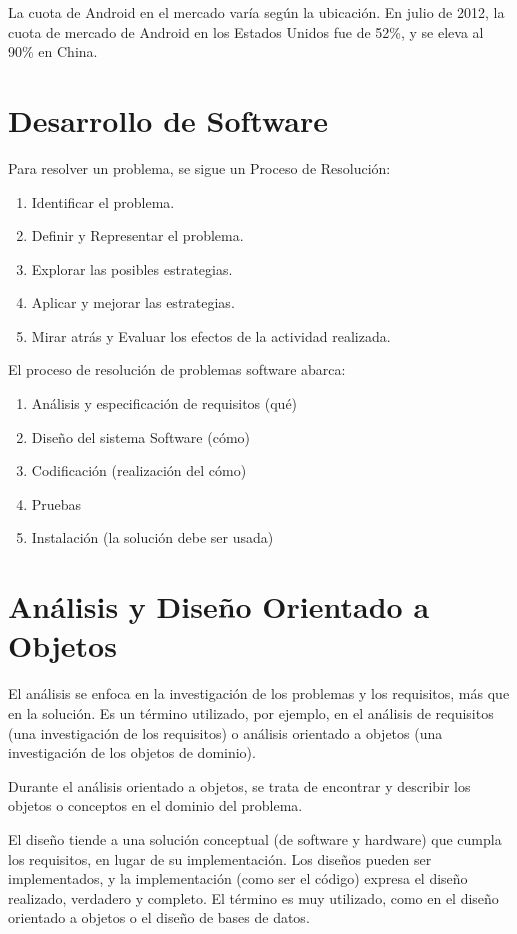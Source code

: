 La cuota de Android en el mercado varía según la ubicación. En julio de 2012, la cuota de mercado de Android en los Estados Unidos fue de 52\%, y se eleva al 90\% en China.

\section{Desarrollo de Software}

Para resolver un problema, se sigue un Proceso de Resolución:

\begin{enumerate}
    \item Identificar el problema.
    \item Definir y Representar el problema.
    \item Explorar las posibles estrategias.
    \item Aplicar y mejorar las estrategias.
    \item Mirar atrás y Evaluar los efectos de la actividad realizada.
\end{enumerate}

El proceso de resolución de problemas software abarca:

\begin{enumerate}
    \item Análisis y especificación de requisitos (qué)
    \item Diseño del sistema Software (cómo)
    \item Codificación (realización del cómo)
    \item Pruebas
    \item Instalación (la solución debe ser usada)
\end{enumerate}

\section{Análisis y Diseño Orientado a Objetos}

El análisis se enfoca en la investigación de los problemas y los requisitos, más que en la solución. Es un término utilizado, por ejemplo, en el análisis de requisitos (una investigación de los requisitos) o análisis orientado a objetos (una investigación de los objetos de dominio).

Durante el análisis orientado a objetos, se trata de encontrar y describir los objetos o conceptos en el dominio del problema.

El diseño tiende a una solución conceptual (de software y hardware) que cumpla los requisitos, en lugar de su implementación. Los diseños pueden ser implementados, y la implementación (como ser el código) expresa el diseño realizado, verdadero y completo.
El término es muy utilizado, como en el diseño orientado a objetos o el diseño de bases de datos.

